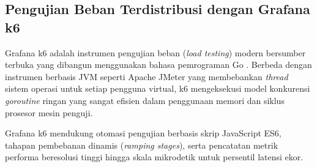 \subsection{Pengujian Beban Terdistribusi dengan Grafana k6}
Grafana k6 adalah instrumen pengujian beban (\textit{load testing}) modern bersumber terbuka yang dibangun menggunakan bahasa pemrograman Go \citep{k6docs2024, sudiatmika2023round}. Berbeda dengan instrumen berbasis JVM seperti Apache JMeter yang membebankan \textit{thread} sistem operasi untuk setiap pengguna virtual, k6 mengeksekusi model konkurensi \textit{goroutine} ringan yang sangat efisien dalam penggunaan memori dan siklus prosesor mesin penguji.

Grafana k6 mendukung otomasi pengujian berbasis skrip JavaScript ES6, tahapan pembebanan dinamis (\textit{ramping stages}), serta pencatatan metrik performa beresolusi tinggi hingga skala mikrodetik untuk persentil latensi ekor.

